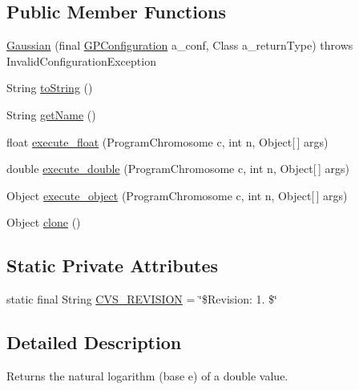 \subsection*{Public Member Functions}
\begin{DoxyCompactItemize}
\item 
\hyperlink{classexamples_1_1gp_1_1symbolic_regression_1_1_gaussian_a2d5af67e6c39df2a0d61c6e6ee5b5154}{Gaussian} (final \hyperlink{classorg_1_1jgap_1_1gp_1_1impl_1_1_g_p_configuration}{G\-P\-Configuration} a\-\_\-conf, Class a\-\_\-return\-Type)  throws Invalid\-Configuration\-Exception 
\item 
String \hyperlink{classexamples_1_1gp_1_1symbolic_regression_1_1_gaussian_aab1569425e9cba9c3d98015321e0601a}{to\-String} ()
\item 
String \hyperlink{classexamples_1_1gp_1_1symbolic_regression_1_1_gaussian_ac8ccca821c19d34895add6cd6f52a4a6}{get\-Name} ()
\item 
float \hyperlink{classexamples_1_1gp_1_1symbolic_regression_1_1_gaussian_ab3916513ab7dbfbe2ba901eb04714d6c}{execute\-\_\-float} (Program\-Chromosome c, int n, Object\mbox{[}$\,$\mbox{]} args)
\item 
double \hyperlink{classexamples_1_1gp_1_1symbolic_regression_1_1_gaussian_a69dae08cd44b02feb7bd88231b24a42e}{execute\-\_\-double} (Program\-Chromosome c, int n, Object\mbox{[}$\,$\mbox{]} args)
\item 
Object \hyperlink{classexamples_1_1gp_1_1symbolic_regression_1_1_gaussian_a4428558d14df2948ae6cec168cf0f2c7}{execute\-\_\-object} (Program\-Chromosome c, int n, Object\mbox{[}$\,$\mbox{]} args)
\item 
Object \hyperlink{classexamples_1_1gp_1_1symbolic_regression_1_1_gaussian_a0694ecce5b10d2b0048020268d86e827}{clone} ()
\end{DoxyCompactItemize}
\subsection*{Static Private Attributes}
\begin{DoxyCompactItemize}
\item 
static final String \hyperlink{classexamples_1_1gp_1_1symbolic_regression_1_1_gaussian_a0fd2293b9bdcfa0b4307083c7bfbfdc7}{C\-V\-S\-\_\-\-R\-E\-V\-I\-S\-I\-O\-N} = \char`\"{}\$Revision\-: 1. \$\char`\"{}
\end{DoxyCompactItemize}


\subsection{Detailed Description}
Returns the natural logarithm (base e) of a double value.

